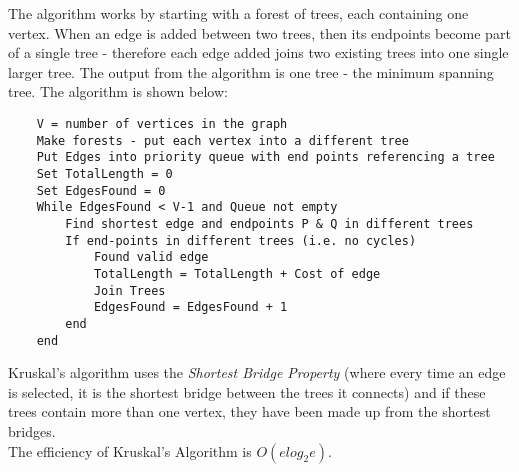 The algorithm works by starting with a forest of trees, each containing one vertex. When an edge is added between two trees, then its endpoints become part of a single tree - therefore each edge added joins two existing trees into one single larger tree. The output from the algorithm is one tree - the minimum spanning tree. The algorithm is shown below:
\begin{verbatim}
    V = number of vertices in the graph
    Make forests - put each vertex into a different tree
    Put Edges into priority queue with end points referencing a tree
    Set TotalLength = 0
    Set EdgesFound = 0
    While EdgesFound < V-1 and Queue not empty
        Find shortest edge and endpoints P & Q in different trees
        If end-points in different trees (i.e. no cycles)
            Found valid edge
            TotalLength = TotalLength + Cost of edge
            Join Trees
            EdgesFound = EdgesFound + 1
        end
    end
\end{verbatim}

Kruskal's algorithm uses the \textit{Shortest Bridge Property} (where every time an edge is selected, it is the shortest bridge between the trees it connects) and if these trees contain more than one vertex, they have been made up from the shortest bridges.\\

The efficiency of Kruskal's Algorithm is $O(e log_2 e)$. 